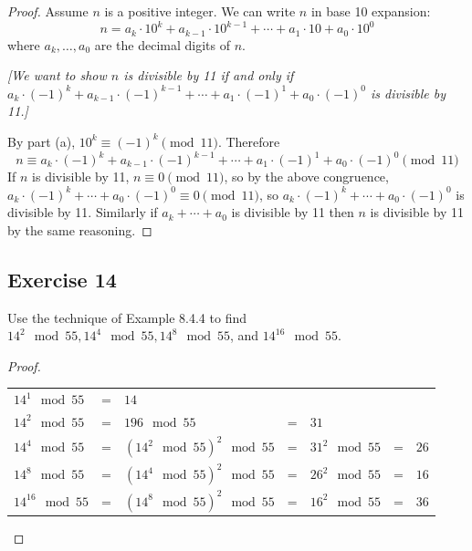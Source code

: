 \documentclass[14pt]{extarticle}
\begin{document}
\begin{proof}
        Assume \(n\) is a positive integer. We can write \(n\) in base 10 expansion:
        \[
                n = a_k \cdot 10^k + a_{k-1} \cdot 10^{k-1} + \cdots + a_1 \cdot 10 + a_0 \cdot 10^0
        \]
        where \(a_k, \ldots, a_0\) are the decimal digits of $n$.

                {\it [We want to show $n$ is divisible by 11 if and only if \(a_k \cdot (-1)^k + a_{k-1} \cdot (-1)^{k-1} + \cdots +
                                a_1 \cdot (-1)^1 + a_0 \cdot (-1)^0\) is divisible by 11.]}

        By part (a), \(10^k \equiv (-1)^{k} \pmod {11}\). Therefore
        \[
                n \equiv a_k \cdot (-1)^k + a_{k-1} \cdot (-1)^{k-1} + \cdots + a_1 \cdot (-1)^1 + a_0 \cdot (-1)^0 \pmod{11}
        \]
        If \(n\) is divisible by 11, \(n \equiv 0 \pmod{11}\), so by the above congruence, \(a_k \cdot (-1)^k + \cdots + a_0
        \cdot (-1)^0 \equiv 0 \pmod{11}\), so \(a_k \cdot (-1)^k + \cdots + a_0 \cdot (-1)^0\) is divisible by 11. Similarly
        if \(a_k + \cdots + a_0\) is divisible by 11 then $n$ is
        divisible by 11 by the same reasoning.
\end{proof}

\subsection{Exercise 14}
Use the technique of Example 8.4.4 to find \(14^2 \mod 55, 14^4 \mod 55, 14^8 \mod 55\), and \(14^{16} \mod 55\).

\begin{proof}
        \begin{tabular}{lclclcl}
                \(14^1 \mod 55\)    & = & \(14\)                                                           \\
                \(14^2 \mod 55\)    & = & \(196 \mod 55\)              & = & \(31\)                        \\
                \(14^4 \mod 55\)    & = & \((14^2 \mod 55)^2 \mod 55\) & = & \(31^2 \mod 55\) & = & \(26\) \\
                \(14^8 \mod 55\)    & = & \((14^4 \mod 55)^2 \mod 55\) & = & \(26^2 \mod 55\) & = & \(16\) \\
                \(14^{16} \mod 55\) & = & \((14^8 \mod 55)^2 \mod 55\) & = & \(16^2 \mod 55\) & = & \(36\)
        \end{tabular}
\end{proof}
\end{document}
